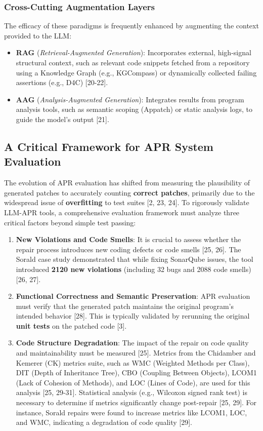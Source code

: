 \subsubsection*{Cross-Cutting Augmentation Layers}
The efficacy of these paradigms is frequently enhanced by augmenting the context provided to the LLM:
\begin{itemize}
    \item \textbf{RAG} (\emph{Retrieval-Augmented Generation}): Incorporates external, high-signal structural context, such as relevant code snippets fetched from a repository using a Knowledge Graph (e.g., KGCompass) or dynamically collected failing assertions (e.g., D4C) [20-22].
    \item \textbf{AAG} (\emph{Analysis-Augmented Generation}): Integrates results from program analysis tools, such as semantic scoping (Appatch) or static analysis logs, to guide the model's output [21].
\end{itemize}

\subsection{A Critical Framework for APR System Evaluation}
\label{ssec:evaluation}

The evolution of APR evaluation has shifted from measuring the plausibility of generated patches to accurately counting \textbf{correct patches}, primarily due to the widespread issue of \textbf{overfitting} to test suites [2, 23, 24]. To rigorously validate LLM-APR tools, a comprehensive evaluation framework must analyze three critical factors beyond simple test passing:

\begin{enumerate}
    \item \textbf{New Violations and Code Smells}:
    It is crucial to assess whether the repair process introduces new coding defects or code smells [25, 26]. The Sorald case study demonstrated that while fixing SonarQube issues, the tool introduced \textbf{2120 new violations} (including 32 bugs and 2088 code smells) [26, 27].

    \item \textbf{Functional Correctness and Semantic Preservation}:
    APR evaluation must verify that the generated patch maintains the original program's intended behavior [28]. This is typically validated by rerunning the original \textbf{unit tests} on the patched code [3].

    \item \textbf{Code Structure Degradation}:
    The impact of the repair on code quality and maintainability must be measured [25]. Metrics from the Chidamber and Kemerer (CK) metrics suite, such as WMC (Weighted Methods per Class), DIT (Depth of Inheritance Tree), CBO (Coupling Between Objects), LCOM1 (Lack of Cohesion of Methods), and LOC (Lines of Code), are used for this analysis [25, 29-31]. Statistical analysis (e.g., Wilcoxon signed rank test) is necessary to determine if metrics significantly change post-repair [25, 29]. For instance, Sorald repairs were found to increase metrics like LCOM1, LOC, and WMC, indicating a degradation of code quality [29].
\end{enumerate}

